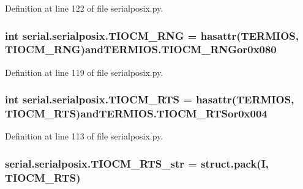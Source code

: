 Definition at line 122 of file serialposix.\+py.

\subsubsection[{\texorpdfstring{T\+I\+O\+C\+M\+\_\+\+R\+NG}{TIOCM_RNG}}]{\setlength{\rightskip}{0pt plus 5cm}int serial.\+serialposix.\+T\+I\+O\+C\+M\+\_\+\+R\+NG = hasattr({\bf T\+E\+R\+M\+I\+OS}, \textquotesingle{}T\+I\+O\+C\+M\+\_\+\+R\+NG\textquotesingle{})and\+T\+E\+R\+M\+I\+O\+S.\+T\+I\+O\+C\+M\+\_\+\+R\+N\+Gor0x080}\hypertarget{namespaceserial_1_1serialposix_a95c1ec661ce3749f6b0893557861ad16}{}\label{namespaceserial_1_1serialposix_a95c1ec661ce3749f6b0893557861ad16}


Definition at line 119 of file serialposix.\+py.

\subsubsection[{\texorpdfstring{T\+I\+O\+C\+M\+\_\+\+R\+TS}{TIOCM_RTS}}]{\setlength{\rightskip}{0pt plus 5cm}int serial.\+serialposix.\+T\+I\+O\+C\+M\+\_\+\+R\+TS = hasattr({\bf T\+E\+R\+M\+I\+OS}, \textquotesingle{}T\+I\+O\+C\+M\+\_\+\+R\+TS\textquotesingle{})and\+T\+E\+R\+M\+I\+O\+S.\+T\+I\+O\+C\+M\+\_\+\+R\+T\+Sor0x004}\hypertarget{namespaceserial_1_1serialposix_aa1c828134bbab0d78000cf1e03f4eb71}{}\label{namespaceserial_1_1serialposix_aa1c828134bbab0d78000cf1e03f4eb71}


Definition at line 113 of file serialposix.\+py.

\subsubsection[{\texorpdfstring{T\+I\+O\+C\+M\+\_\+\+R\+T\+S\+\_\+str}{TIOCM_RTS_str}}]{\setlength{\rightskip}{0pt plus 5cm}serial.\+serialposix.\+T\+I\+O\+C\+M\+\_\+\+R\+T\+S\+\_\+str = struct.\+pack(\textquotesingle{}I\textquotesingle{}, {\bf T\+I\+O\+C\+M\+\_\+\+R\+TS})}\hypertarget{namespaceserial_1_1serialposix_ab7163a1c4589cb90c66933ee66028984}{}\label{namespaceserial_1_1serialposix_ab7163a1c4589cb90c66933ee66028984}


